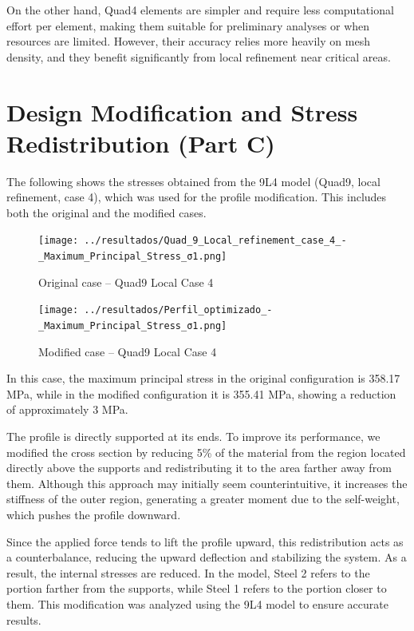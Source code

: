 \documentclass[12pt]{article}
\begin{document}
On the other hand, Quad4 elements are simpler and require less computational effort per element, making them suitable for preliminary analyses or when resources are limited. However, their accuracy relies more heavily on mesh density, and they benefit significantly from local refinement near critical areas.

\newpage
\section{Design Modification and Stress Redistribution (Part C)}

The following shows the stresses obtained from the 9L4 model (Quad9, local refinement, case 4), which was used for the profile modification. This includes both the original and the modified cases.

\begin{figure}[H]
    \centering
    \begin{minipage}{0.48\textwidth}
        \centering
        \texttt{[image: ../resultados/Quad\_9\_Local\_refinement\_case\_4\_-\_Maximum\_Principal\_Stress\_σ1.png]}
        \caption{Original case – Quad9 Local Case 4}
        \label{fig:quad9_local4_original}
    \end{minipage}
    \hfill
    \begin{minipage}{0.48\textwidth}
        \centering
        \texttt{[image: ../resultados/Perfil\_optimizado\_-\_Maximum\_Principal\_Stress\_σ1.png]}
        \caption{Modified case – Quad9 Local Case 4}
        \label{fig:quad9_local4_modified}
    \end{minipage}
\end{figure}

In this case, the maximum principal stress in the original configuration is 358.17 MPa, while in the modified configuration it is 355.41 MPa, showing a reduction of approximately 3 MPa.

The profile is directly supported at its ends. To improve its performance, we modified the cross section by reducing 5\% of the material from the region located directly above the supports and redistributing it to the area farther away from them. Although this approach may initially seem counterintuitive, it increases the stiffness of the outer region, generating a greater moment due to the self-weight, which pushes the profile downward.

Since the applied force tends to lift the profile upward, this redistribution acts as a counterbalance, reducing the upward deflection and stabilizing the system. As a result, the internal stresses are reduced. In the model, Steel 2 refers to the portion farther from the supports, while Steel 1 refers to the portion closer to them. This modification was analyzed using the 9L4 model to ensure accurate results.
\end{document}

